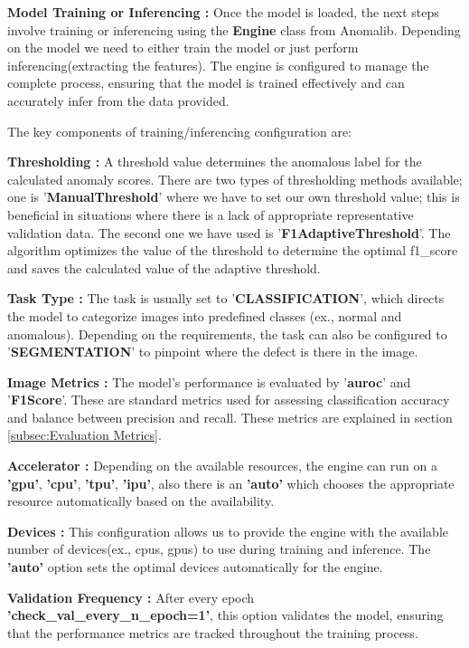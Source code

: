 \textbf{Model Training or Inferencing :} Once the model is loaded, the next steps involve training or inferencing using the \textbf{Engine} class from Anomalib. Depending on the model we need to either train the model or just perform inferencing(extracting the features). The engine is configured to manage the complete process, ensuring that the model is trained effectively and can accurately infer from the data provided.

The key components of training/inferencing configuration are:

\textbf{Thresholding :} A threshold value determines the anomalous label for the calculated anomaly scores. There are two types of thresholding methods available; one is '\textbf{ManualThreshold}' where we have to set our own threshold value; this is beneficial in situations where there is a lack of appropriate representative validation data\cite{9897283}. The second one we have used is '\textbf{F1AdaptiveThreshold}'. The algorithm optimizes the value of the threshold to determine the optimal f1\_score and saves the calculated value of the adaptive threshold.\cite{Anomalib2024}

\textbf{Task Type :} The task is usually set to '\textbf{CLASSIFICATION}', which directs the model to categorize images into predefined classes (ex., normal and anomalous). Depending on the requirements, the task can also be configured to '\textbf{SEGMENTATION}' to pinpoint where the defect is there in the image.

\textbf{Image Metrics :} The model's performance is evaluated by '\textbf{\gls{auroc}}' and '\textbf{F1Score}'. These are standard metrics used for assessing classification accuracy and balance between precision and recall. These metrics are explained in section \ref{subsec:Evaluation Metrics}.

\textbf{Accelerator :} Depending on the available resources, the engine can run on a \textbf{'\gls{gpu}'}, \textbf{'\gls{cpu}'}, \textbf{'\gls{tpu}'}, \textbf{'\gls{ipu}'}, also there is an \textbf{'auto'} which chooses the appropriate resource automatically based on the availability.

\textbf{Devices :} This configuration allows us to provide the engine with the available number of devices(ex., \glspl{cpu}, \glspl{gpu}) to use during training and inference. The \textbf{'auto'} option sets the optimal devices automatically for the engine.

\textbf{Validation Frequency :} After every epoch \textbf{'check\_val\_every\_n\_epoch=1'}, this option validates the model, ensuring that the performance metrics are tracked throughout the training process.

